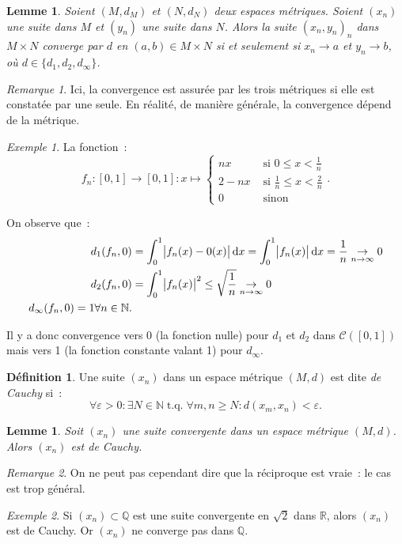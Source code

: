 \documentclass{report}
\newtheorem{lem}[thm]{Lemme}
\theoremstyle{definition}
\newtheorem{déf}[thm]{Définition}
\theoremstyle{remark}
\newtheorem*{rmq}{Remarque}
\newtheorem{ex}{Exemple}[section]
\DeclareMathOperator{\tq}{\text{ t.q. }}
\newcommand{\R}{\mathbb R}
\newcommand{\Q}{\mathbb Q}
\newcommand{\N}{\mathbb N}
\begin{document}
		\begin{lem} Soient $(M, d_M)$ et $(N, d_N)$ deux espaces métriques. Soient $(x_n)$ une suite dans $M$ et $(y_n)$ une suite dans $N$. Alors la suite
		$(x_n, y_n)_n$ dans $M \times N$ converge par $d$ en $(a, b) \in M \times N$ si et seulement si $x_n \to a$ et $y_n \to b$, où
		$d \in \{d_1, d_2, d_\infty\}$. \end{lem}

		\begin{rmq} Ici, la convergence est assurée par les trois métriques si elle est constatée par une seule. En réalité, de manière générale, la convergence
		dépend de la métrique. \end{rmq}

		\begin{ex} La fonction~:
		\[f_n : [0, 1] \to [0, 1] : x \mapsto
			\begin{cases}nx &\text{ si } 0 \leq x < \frac 1n \\2-nx &\text{ si } \frac 1n \leq x < \frac 2n \\0 &\text{ sinon}\end{cases}.\]

		On observe que~:
		\begin{align*}
			d_1(f_n, 0) &= \int_0^1\abs{f_n(x) - 0(x)}\dif x = \int_0^1\abs {f_n(x)}\dif x = \frac 1n \underset {n \to \infty}\to 0 \\
			d_2(f_n, 0) &= \int_0^1\abs{f_n(x)}^2 \leq \sqrt{\frac 1n} \underset {n \to \infty}\to 0 \\
			d_\infty(f_n, 0) = 1 \forall n \in \N.
		\end{align*}

		Il y a donc convergence vers 0 (la fonction nulle) pour $d_1$ et $d_2$ dans $\mathcal C([0, 1])$ mais vers 1 (la fonction constante valant 1)
		pour $d_\infty$. \end{ex}

		\begin{déf} Une suite $(x_n)$ dans un espace métrique $(M, d)$ est dite \textit{de Cauchy} si~:
		\[\forall \varepsilon > 0 : \exists N \in \N \tq \forall m, n \geq N : d(x_m, x_n) < \varepsilon.\]
		\end{déf}

		\begin{lem} Soit $(x_n)$ une suite convergente dans un espace métrique $(M, d)$. Alors $(x_n)$ est de Cauchy. \end{lem}

		\begin{rmq} On ne peut pas cependant dire que la réciproque est vraie~: le cas est trop général. \end{rmq}

		\begin{ex} Si $(x_n) \subset \Q$ est une suite convergente en $\sqrt 2$ dans $\R$, alors $(x_n)$ est de Cauchy. Or $(x_n)$ ne converge pas dans $\Q$.
		\end{ex}

\end{document}
